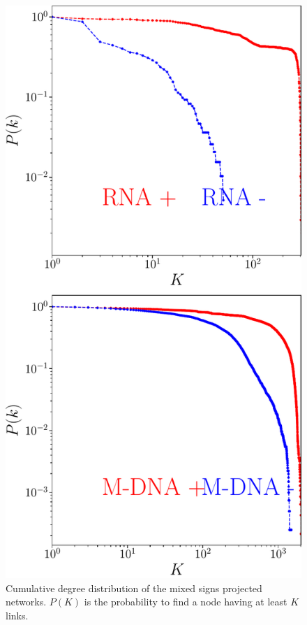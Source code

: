 \documentclass[10pt,a4paper]{article}
\begin{document}
\begin{figure}[h!]
\centering
\includegraphics[scale=0.3]{degree-distr-mixed.pdf}
\caption{\label{fig:degreedistrmixed}Cumulative degree distribution of the mixed signs projected networks. $P(K)$ is the probability to find a node having at least $K$ links.}
\end{figure}
\end{document}
